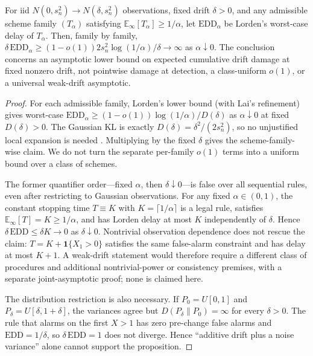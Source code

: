 \begin{proposition}
For iid $N(0,s_n^2)\to N(\delta,s_n^2)$ observations, fixed drift
$\delta>0$, and any admissible scheme family $(T_\alpha)$ satisfying
$\mathbb{E}_\infty[T_\alpha]\ge1/\alpha$, let $\mathrm{EDD}_\alpha$ be
Lorden's worst-case delay of $T_\alpha$. Then, family by family,
$\delta\,\mathrm{EDD}_\alpha\ge(1-o(1))2s_n^2\log(1/\alpha)/\delta\to\infty$
as $\alpha\downarrow0$. The conclusion concerns an asymptotic lower bound on
expected cumulative drift damage at fixed nonzero drift, not pointwise
damage at detection, a class-uniform $o(1)$, or a universal weak-drift
asymptotic.
\end{proposition}
\begin{proof}
For each admissible family, Lorden's lower bound (with Lai's refinement)
gives worst-case $\mathrm{EDD}_\alpha\ge(1-o(1))\log(1/\alpha)/D(\delta)$
as $\alpha\downarrow0$ at fixed $D(\delta)>0$. The Gaussian KL is exactly
$D(\delta)=\delta^2/(2s_n^2)$, so no unjustified local expansion is needed
\citep{lorden1971,lai1995,tartakovsky2014}. Multiplying by the fixed
$\delta$ gives the scheme-family-wise claim. We do not turn the separate
per-family $o(1)$ terms into a uniform bound over a class of schemes.

The former quantifier order---fixed $\alpha$, then
$\delta\downarrow0$---is false over all sequential rules, even after
restricting to Gaussian observations. For any fixed $\alpha\in(0,1)$, the
constant stopping time $T\equiv K$ with $K=\lceil1/\alpha\rceil$ is a legal
rule, satisfies $\mathbb{E}_\infty[T]=K\ge1/\alpha$, and has Lorden delay at
most $K$ independently of $\delta$. Hence $\delta\,\mathrm{EDD}\le\delta K
\to0$ as $\delta\downarrow0$. Nontrivial observation dependence does not
rescue the claim: $T=K+\mathbf 1\{X_1>0\}$ satisfies the same false-alarm
constraint and has delay at most $K+1$. A weak-drift statement would
therefore require a different class of procedures and additional
nontrivial-power or consistency premises, with a separate joint-asymptotic
proof; none is claimed here.

The distribution restriction is also necessary. If $P_0=U[0,1]$ and
$P_\delta=U[\delta,1+\delta]$, the variances agree but
$D(P_\delta\|P_0)=\infty$ for every $\delta>0$. The rule that alarms on the
first $X>1$ has zero pre-change false alarms and $\mathrm{EDD}=1/\delta$, so
$\delta\,\mathrm{EDD}=1$ does not diverge. Hence ``additive drift plus a
noise variance'' alone cannot support the proposition.
\end{proof}

